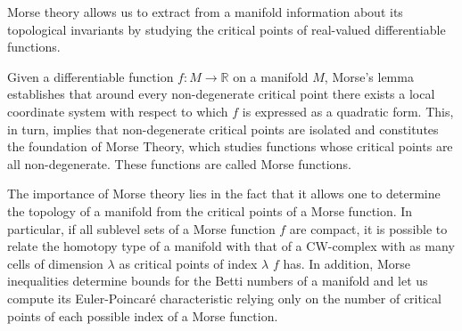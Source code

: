 
Morse theory allows us to extract from a manifold information about its topological invariants by studying the critical points of real-valued differentiable functions.

Given a differentiable function $f:M\to \mathbb{R}$ on a manifold $M$, Morse's lemma establishes that around every non-degenerate critical point there exists a local coordinate system with respect to which $f$ is expressed as a quadratic form. This, in turn, implies that non-degenerate critical points are isolated and constitutes the foundation of Morse Theory, which studies functions whose critical points are all non-degenerate. These functions are called Morse functions.

The importance of Morse theory lies in the fact that it allows one to determine the topology of a manifold from the critical points of a Morse function. In particular, if all sublevel sets of a Morse function $f$ are compact, it is possible to relate the homotopy type of a manifold with that of a CW-complex with as many cells of dimension $\lambda$ as critical points of index $\lambda$ $f$ has. In addition, Morse inequalities determine bounds for the Betti numbers of a manifold and let us compute its Euler-Poincaré characteristic relying only on the number of critical points of each possible index of a Morse function.

